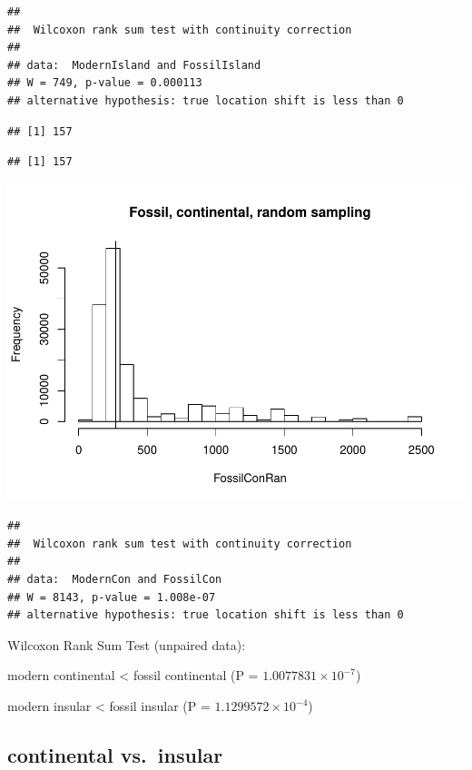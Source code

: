 \documentclass[]{article}
\begin{document}
\begin{verbatim}
## 
##  Wilcoxon rank sum test with continuity correction
## 
## data:  ModernIsland and FossilIsland
## W = 749, p-value = 0.000113
## alternative hypothesis: true location shift is less than 0
\end{verbatim}

\begin{verbatim}
## [1] 157
\end{verbatim}

\begin{verbatim}
## [1] 157
\end{verbatim}

\includegraphics{MA_JJ_files/figure-latex/RSMFCI-2.pdf}

\begin{verbatim}
## 
##  Wilcoxon rank sum test with continuity correction
## 
## data:  ModernCon and FossilCon
## W = 8143, p-value = 1.008e-07
## alternative hypothesis: true location shift is less than 0
\end{verbatim}

Wilcoxon Rank Sum Test (unpaired data):

modern continental \textless{} fossil continental (P =
\(1.0077831\times 10^{-7}\))

modern insular \textless{} fossil insular (P =
\(1.1299572\times 10^{-4}\))

\newpage

\subsection{continental vs.~insular}\label{continental-vs.insular-1}
\end{document}
